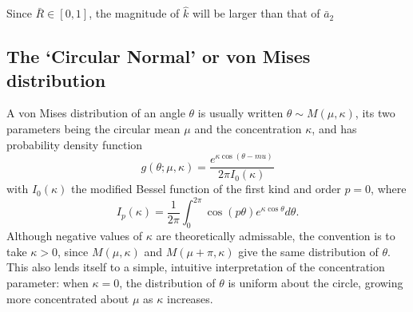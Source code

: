 \documentclass[../../ArchStats.tex]{subfiles}
\begin{document}
Since $\bar{R} \in [0,1]$, the magnitude of $\hat{k}$ will be larger than that of $\bar{a}_2$



\subsection{The `Circular Normal' or von Mises distribution}



A von Mises distribution of an angle $\theta$ is usually written $\theta \sim M(\mu, \kappa)$, its two parameters being the circular mean $\mu$ and the concentration $\kappa$, and has probability density function
\[g(\theta; \mu, \kappa) = \frac{e^{\kappa \cos(\theta - mu)}}{2\pi I_0(\kappa)}\]
with $I_0(\kappa)$ the modified Bessel function of the first kind and order $p=0$, where
\[I_p(\kappa) = \frac{1}{2\pi}\int_0^{2\pi} \cos(p\theta)e^{\kappa \cos \theta} d\theta.\]
Although negative values of $\kappa$ are theoretically admissable, the convention is to take $\kappa > 0$, since $M(\mu, \kappa)$ and $M(\mu + \pi, \kappa)$ give the same distribution of $\theta$. This also lends itself to a simple, intuitive interpretation of the concentration parameter: when $\kappa = 0$, the distribution of $\theta$ is uniform about the circle, growing more concentrated about $\mu$ as $\kappa$ increases. 
\end{document}
